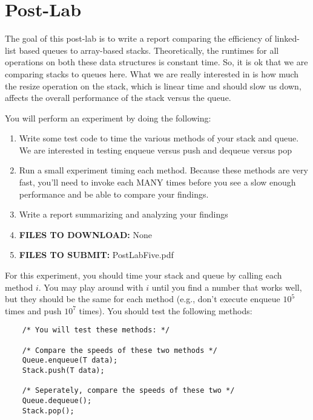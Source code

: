 \documentclass[paper=a4, fontsize=11pt, parskip=full]{scrartcl} %
\numberwithin{equation}{section} %
\numberwithin{figure}{section} %
\numberwithin{table}{section} %
\begin{document}


\newpage
\section{Post-Lab}

The goal of this post-lab is to write a report comparing the efficiency of linked-list based queues to array-based stacks. Theoretically, the runtimes for all operations on both these data structures is constant time. So, it is ok that we are comparing stacks to queues here. What we are really interested in is how much the resize operation on the stack, which is linear time and should slow us down, affects the overall performance of the stack versus the queue.

You will perform an experiment by doing the following:

\begin{enumerate}
	\item Write some test code to time the various methods of your stack and queue. We are interested in testing enqueue versus push and dequeue versus pop
	\item Run a small experiment timing each method. Because these methods are very fast, you'll need to invoke each MANY times before you see a slow enough performance and be able to compare your findings.
	\item Write a report summarizing and analyzing your findings
	\item \textbf{FILES TO DOWNLOAD:} None
	\item \textbf{FILES TO SUBMIT:} PostLabFive.pdf
\end{enumerate}

For this experiment, you should time your stack and queue by calling each method $i$. You may play around with $i$ until you find a number that works well, but they should be the same for each method (e.g., don't execute enqueue $10^5$ times and push $10^7$ times). You should test the following methods:

\begin{lstlisting}
	/* You will test these methods: */

	/* Compare the speeds of these two methods */
	Queue.enqueue(T data);
	Stack.push(T data);

	/* Seperately, compare the speeds of these two */
	Queue.dequeue();
	Stack.pop();
\end{lstlisting}
\end{document}
